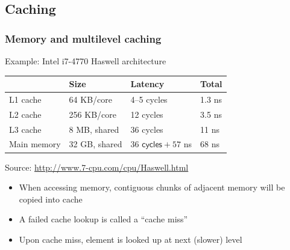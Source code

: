\documentclass[usenames,dvipsnames,mathserif,compress]{beamer}
\begin{document}
\subsection*{Caching}

\begin{frame}
  \frametitle{Memory and multilevel caching}
  Example: Intel i7-4770 Haswell architecture\\
  \medskip
  \begin{tabular}{llll}
     & Size & Latency & Total \\
    \hline\hline
    L1 cache & 64 KB/core & 4--5 cycles & 1.3 ns\\
    L2 cache & 256 KB/core & 12 cycles & 3.5 ns \\
    L3 cache & 8 MB, shared & 36 cycles & 11 ns\\
    Main memory & 32 GB, shared & $36\textsf{ cycles} + 57$ ns & 68 ns\\\hline\hline
  \end{tabular}
  Source: \url{http://www.7-cpu.com/cpu/Haswell.html}
  \bigskip
  \begin{itemize}
  \item When accessing memory, contiguous chunks of adjacent memory will be copied into cache
  \item A failed cache lookup is called a ``cache miss''
  \item Upon cache miss, element is looked up at next (slower) level
  \end{itemize}

\end{frame}
\end{document}
